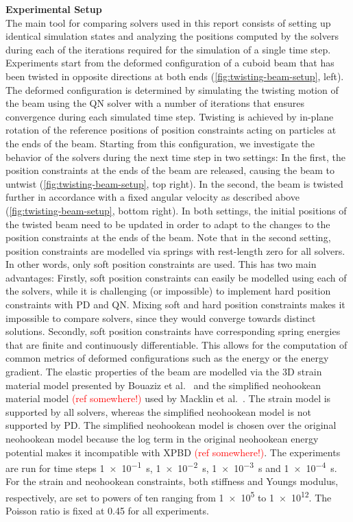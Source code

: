 \noindent \textbf{Experimental Setup} \\
\noindent The main tool for comparing solvers used in this report consists of setting up identical simulation states and analyzing the positions 
computed by the solvers during each of the iterations required for the simulation of a single time step. Experiments start from the 
deformed configuration of a cuboid beam that has been twisted in opposite directions at both ends (\cref{fig:twisting-beam-setup}, left).
The deformed configuration is determined by simulating the twisting motion of the beam using the QN solver with a number of iterations 
that ensures convergence during each simulated time step. Twisting is achieved by in-plane rotation of the reference positions of 
position constraints acting on particles at the ends of the beam. Starting from this configuration, we investigate the behavior of the 
solvers during the next time step in two settings: In the first, the position constraints at the ends of the beam are released, causing the 
beam to untwist (\cref{fig:twisting-beam-setup}, top right). In the second, the beam is twisted further in accordance with a fixed angular
velocity as described above (\cref{fig:twisting-beam-setup}, bottom right). In both settings, the initial positions of the twisted beam 
need to be updated in order to adapt to the changes to 
the position constraints at the ends of the beam. Note that in the second setting, position constraints are modelled 
via springs with rest-length zero for all solvers. In other words, only soft position constraints are used. This has two main advantages:
Firstly, soft position constraints can easily be modelled using each of the solvers, while it is challenging (or impossible) to 
implement hard position constraints with PD and QN. Mixing soft and hard position constraints makes it impossible to compare solvers,
since they would converge towards distinct solutions. Secondly, soft position constraints have corresponding spring energies that are 
finite and continuously differentiable. This allows for the computation of common metrics of deformed configurations such as the energy 
or the energy gradient. The elastic properties of the beam are modelled via the 3D strain material model presented by Bouaziz et al.\ 
\cite{bouaziz2014} and the simplified neohookean material model \textcolor{red}{(ref somewhere!)} used by Macklin et al.\ 
\cite{macklin2021}. The strain model is supported by all solvers, whereas the simplified neohookean model is not supported by PD. The 
simplified neohookean model is chosen over the original neohookean model because the log term in the original neohookean energy potential
makes it incompatible with XPBD \textcolor{red}{(ref somewhere!)}. The experiments are run for time steps \SI{1e-1}{\second}, 
\SI{1e-2}{\second}, \SI{1e-3}{\second} and \SI{1e-4}{\second}. For the strain and neohookean constraints, both stiffness and 
Youngs modulus, respectively, are set to powers of ten ranging from \num{1e5} to \num{1e12}. The Poisson ratio is fixed at 0.45 for 
all experiments.

